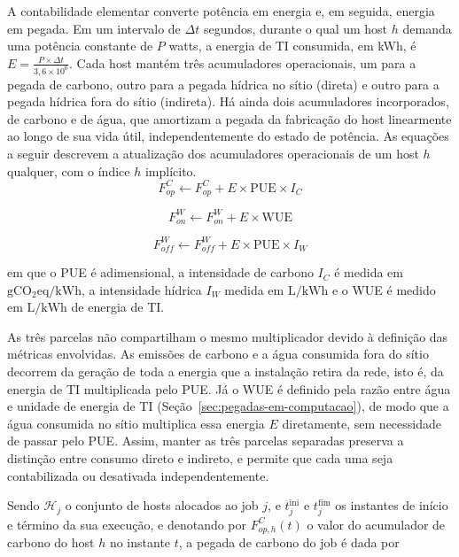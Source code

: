 A contabilidade elementar converte potência em energia e, em seguida,
energia em pegada. Em um intervalo de $\Delta t$ segundos, durante o qual um host $h$ demanda uma potência
constante de $P$ watts, a energia de TI consumida, em kWh, é $E = \frac{P \times \Delta t}{3,6 \times 10^6}$.
Cada host mantém três acumuladores operacionais, um para a pegada de carbono, outro para 
a pegada hídrica no sítio (direta) e outro para a pegada hídrica fora do sítio (indireta). Há ainda
dois acumuladores incorporados, de carbono e de água, que amortizam a pegada da fabricação do host
linearmente ao longo de sua vida útil, independentemente do estado de potência.
As equações a seguir descrevem a atualização dos acumuladores operacionais de um host $h$ qualquer, com o índice $h$ implícito.
    \begin{equation}
        \label{eq:pegada-carbono}
        F^{C}_{op} \leftarrow F^{C}_{op} + E \times \mathrm{PUE} \times I_{C}
    \end{equation}

    \begin{equation}
        \label{eq:pegada-hidrica-onsite}
        F^{W}_{on} \leftarrow F^{W}_{on} + E \times \mathrm{WUE}
    \end{equation}

    \begin{equation}
        \label{eq:pegada-hidrica-offsite}
        F^{W}_{off} \leftarrow F^{W}_{off} + E \times \mathrm{PUE} \times I_{W}
    \end{equation}

em que o PUE é adimensional, a intensidade de carbono $I_{C}$ é medida em $\mathrm{gCO_{2}eq/kWh}$, 
a intensidade hídrica $I_{W}$ medida em $\mathrm{L/kWh}$ e o WUE é medido em $\mathrm{L/kWh}$ de energia de TI.

As três parcelas não compartilham o mesmo multiplicador devido à definição das 
métricas envolvidas. As emissões de carbono e a água consumida
fora do sítio decorrem da geração de toda a energia que a instalação retira da rede, isto é,
da energia de TI multiplicada pelo PUE. Já o WUE é definido pela razão entre água e unidade de energia de TI 
(Seção~\ref{sec:pegadas-em-computacao}), de modo que a água consumida no sítio multiplica essa energia $E$ diretamente,
sem necessidade de passar pelo PUE. Assim, manter as três parcelas
separadas preserva a distinção entre consumo direto e indireto, e permite que
cada uma seja contabilizada ou desativada independentemente. 

Sendo $\mathcal{H}_{j}$ o conjunto de hosts alocados ao job $j$, e $t^{\mathrm{ini}}_{j}$ e 
$t^{\mathrm{fim}}_{j}$ os
instantes de início e término da sua execução, e denotando por $F^{C}_{op,h}(t)$ 
o valor do acumulador de carbono 
do host $h$ no instante $t$, a pegada de carbono do job é dada por

